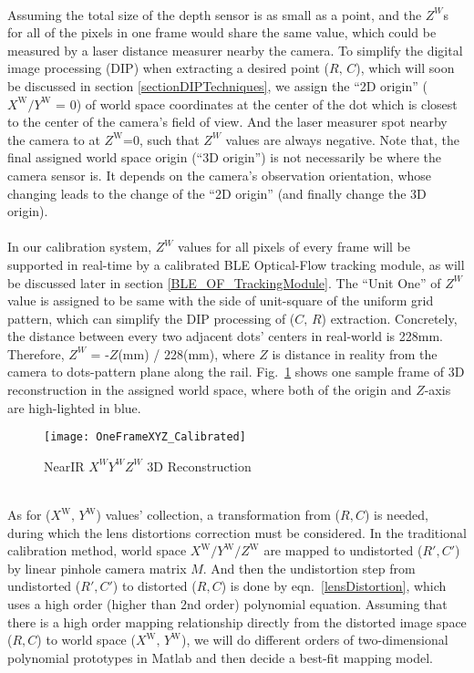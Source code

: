 \\\indent%
Assuming the total size of the depth sensor is as small as a point, and the \(Z^W\)s for all of the pixels in one frame would share the same value, which could be measured by a laser distance measurer nearby the camera. To simplify the digital image processing (DIP) when extracting a desired point (\(R,\, C\)), which will soon be discussed in section \ref{sectionDIPTechniques}, we assign the \enquote{2D origin} (\(X^\text{W}/Y^\text{W}\) = 0) of world space coordinates at the center of the dot which is closest to the center of the camera's field of view. And the laser measurer spot nearby the camera to at \(Z^\text{W}\)=0, such that \(Z^{W}\) values are always negative. Note that, the final assigned world space origin (\enquote{3D origin}) is not necessarily be where the camera sensor is. It depends on the camera's observation orientation, whose changing leads to the change of the \enquote{2D origin} (and finally change the 3D origin).
\\\\\indent
In our calibration system, \(Z^{W}\) values for all pixels of every frame will be supported in real-time by a calibrated BLE Optical-Flow tracking module, as will be discussed later in section \ref{BLE_OF_TrackingModule}. The \enquote{Unit One} of \(Z^{W}\) value is assigned to be same with the side of unit-square of the uniform grid pattern, which can simplify the DIP processing of (\(C, \, R\)) extraction. Concretely, the distance between every two adjacent dots' centers in real-world is 228mm. Therefore, \(Z^{W}\) = -\(Z\)(mm) / 228(mm), where \(Z\) is distance in reality from the camera to dots-pattern plane along the rail. Fig.~\ref{OneFrameXYZ_Calibrated} shows one sample frame of 3D reconstruction in the assigned world space, where both of the origin and \(Z\)-axis are high-lighted in blue.
%
\begin{figure}[!t]
\centering
\texttt{[image: OneFrameXYZ\_Calibrated]}
\caption{NearIR \(X^{W}Y^{W}Z^{W}\) 3D Reconstruction}
\label{OneFrameXYZ_Calibrated}
\end{figure}%
%
\\\indent
As for (\(X^\text{W}, \, Y^\text{W}\)) values' collection, a transformation from (\(R, C\)) is needed, during which the lens distortions correction must be considered. In the traditional calibration method, world space \(X^\text{W}/Y^\text{W}/Z^\text{W}\) are mapped to undistorted (\(R', C'\)) by linear pinhole camera matrix \(M\). And then the undistortion step from undistorted (\(R', C'\)) to distorted (\(R, C\)) is done by eqn.~\ref{lensDistortion}, which uses a high order (higher than 2nd order) polynomial equation. Assuming that there is a high order mapping relationship directly from the distorted image space (\(R, C\)) to world space (\(X^\text{W}, \, Y^\text{W}\)), we will do different orders of two-dimensional polynomial prototypes in Matlab and then decide a best-fit mapping model.
